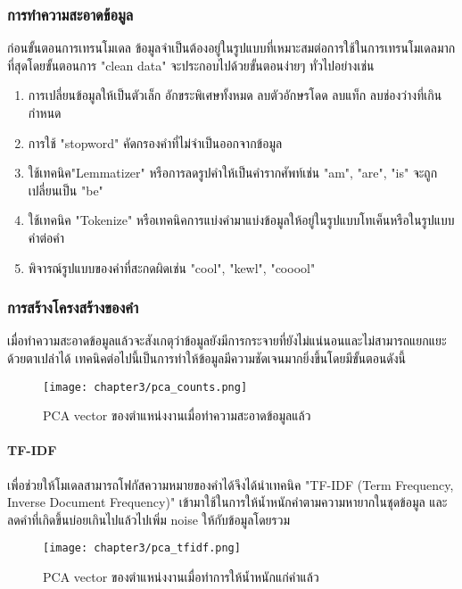   \subsubsection*{การทำความสะอาดข้อมูล}
    ก่อนขั้นตอนการเทรนโมเดล ข้อมูลจำเป็นต้องอยู่ในรูปแบบที่เหมาะสมต่อการใช้ในการเทรนโมเดลมากที่สุดโดยขั้นตอนการ "clean data" จะประกอบไปด้วยขั้นตอนง่ายๆ ทั่วไปอย่างเช่น 
    \begin{enumerate}
      \item การเปลี่ยนข้อมูลให้เป็นตัวเล็ก อักขระพิเศษทั้งหมด ลบตัวอักษรโดด ลบแท็ก ลบช่องว่างที่เกินกำหนด
      \item การใช้ "stopword" คัดกรองคำที่ไม่จำเป็นออกจากข้อมูล
      \item ใช้เทคนิค"Lemmatizer" หรือการลดรูปคำให้เป็นคำรากศัพท์เช่น "am", "are", "is" จะถูกเปลี่ยนเป็น "be" 
      \item ใช้เทคนิค "Tokenize" หรือเทคนิคการแบ่งคำมาแบ่งข้อมูลให้อยู่ในรูปแบบโทเค็นหรือในรูปแบบคำต่อคำ
      \item พิจารณ์รูปแบบของคำที่สะกดผิดเช่น "cool", "kewl", "cooool"
    \end{enumerate}
    
  \subsubsection*{การสร้างโครงสร้างของคำ}
  เมื่อทำความสะอาดข้อมูลแล้วจะสังเกตุว่าข้อมูลยังมีการกระจายที่ยังไม่แน่นอนและไม่สามารถแยกแยะด้วยตาเปล่าได้ เทคนิคต่อไปนี้เป็นการทำให้ข้อมูลมีความชัดเจนมากยิ่งขึ้นโดยมีขั้นตอนดังนี้
  \begin{figure}[!h]
    \centering
    \texttt{[image: chapter3/pca\_counts.png]}  
    \caption{PCA vector ของตำแหน่งงานเมื่อทำความสะอาดข้อมูลแล้ว}
    \label{Fig:pca-count}
  \end{figure}

  \paragraph*{TF-IDF} เพื่อช่วยให้โมเดลสามารถโฟกัสความหมายของคำได้จึงได้นำเทคนิค "TF-IDF (Term Frequency, Inverse Document Frequency)" เข้ามาใช้ในการให้น้ำหนักคำตามความหายากในชุดข้อมูล และลดคำที่เกิดขึ้นบ่อยเกินไปแล้วไปเพิ่ม noise ให้กับข้อมูลโดยรวม \par
  \begin{figure}[!h]
    \centering
    \texttt{[image: chapter3/pca\_tfidf.png]}  
    \caption{PCA vector ของตำแหน่งงานเมื่อทำการให้น้ำหนักแก่คำแล้ว}
    \label{Fig:pca-tfidf}
  \end{figure}

